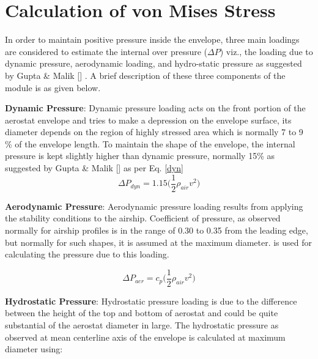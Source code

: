 \chapter{Calculation of von Mises Stress}
\label{Hoop stress}

In order to maintain positive pressure inside the envelope, three main loadings are considered to estimate the internal over pressure ($ \Delta P $) viz., the loading due to dynamic pressure, aerodynamic loading, and hydro-static pressure as suggested by Gupta \& Malik [] . A brief description of these three components of the module is as given below.

\textbf{Dynamic Pressure}: Dynamic pressure loading acts on the front portion of the aerostat envelope and tries to make a depression on the envelope surface, its diameter depends on the region of highly stressed area which is normally 7 to 9 \% of the envelope length. To maintain the shape of the envelope, the internal pressure is kept slightly higher than dynamic pressure, normally 15\% as suggested by Gupta \& Malik [] as per Eq. \ref{dyn}
\begin{equation}
\label{dyn}
\Delta P_{dyn} = 1.15 \bigg( \frac{1}{2} \rho_{air} v^{2} \bigg)
\end{equation}

\textbf{Aerodynamic Pressure}: Aerodynamic pressure loading results from applying the stability conditions to the airship. Coefficient of pressure, as observed normally for airship profiles is in the range of 0.30 to 0.35 from the leading edge, but normally for such shapes, it is assumed at the maximum diameter. is used for calculating the pressure due to this loading.

\begin{equation}
\label{aer}
\Delta P_{aer} = c_{p} \bigg( \frac{1}{2} \rho_{air} v^{2} \bigg)
\end{equation}

\textbf{Hydrostatic Pressure}: Hydrostatic pressure loading is due to the difference between the height of the top and bottom of aerostat and could be quite substantial of the aerostat diameter in large. The hydrostatic pressure as observed at mean centerline axis of the envelope is calculated at maximum diameter using:

